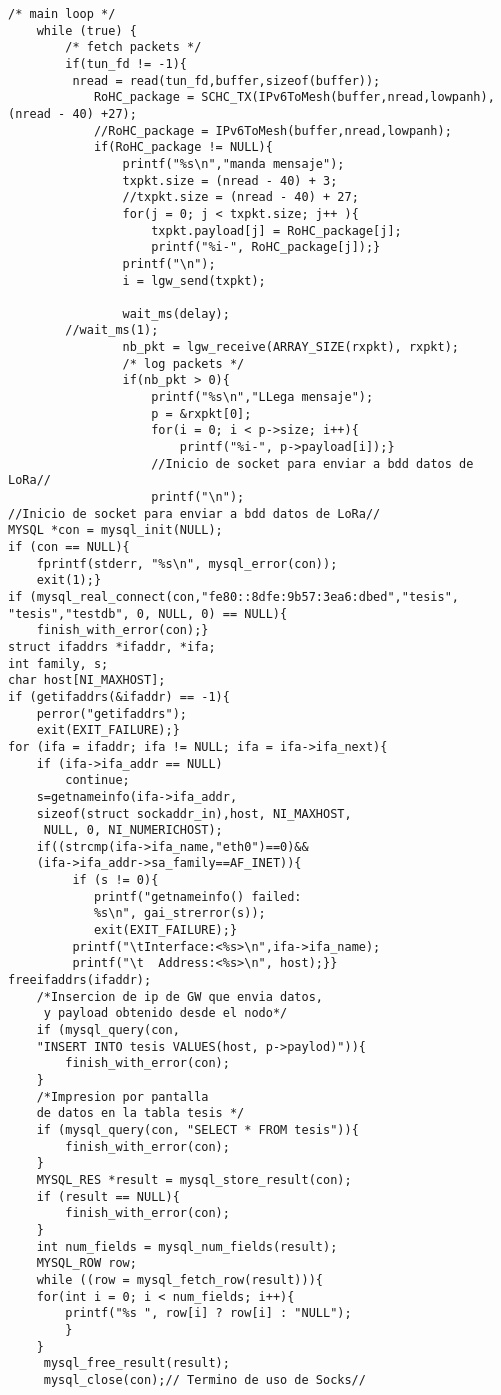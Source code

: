 \begin{lstlisting}[frame=single,caption=Extracto de código del módulo de transición LoRa/IPv6	]  % Start your code-block
/* main loop */
    while (true) {
        /* fetch packets */
        if(tun_fd != -1){
         nread = read(tun_fd,buffer,sizeof(buffer));   
            RoHC_package = SCHC_TX(IPv6ToMesh(buffer,nread,lowpanh),(nread - 40) +27);
            //RoHC_package = IPv6ToMesh(buffer,nread,lowpanh);
            if(RoHC_package != NULL){
                printf("%s\n","manda mensaje");
                txpkt.size = (nread - 40) + 3;
                //txpkt.size = (nread - 40) + 27;
                for(j = 0; j < txpkt.size; j++ ){
                    txpkt.payload[j] = RoHC_package[j];
                    printf("%i-", RoHC_package[j]);}
                printf("\n");
                i = lgw_send(txpkt);

                wait_ms(delay);
        //wait_ms(1);
                nb_pkt = lgw_receive(ARRAY_SIZE(rxpkt), rxpkt);
                /* log packets */
                if(nb_pkt > 0){
                    printf("%s\n","LLega mensaje");
                    p = &rxpkt[0];
                    for(i = 0; i < p->size; i++){
                        printf("%i-", p->payload[i]);}
                    //Inicio de socket para enviar a bdd datos de LoRa//
                    printf("\n");
//Inicio de socket para enviar a bdd datos de LoRa//
MYSQL *con = mysql_init(NULL);
if (con == NULL){
	fprintf(stderr, "%s\n", mysql_error(con));
    exit(1);}
if (mysql_real_connect(con,"fe80::8dfe:9b57:3ea6:dbed","tesis", "tesis","testdb", 0, NULL, 0) == NULL){
	finish_with_error(con);} 
struct ifaddrs *ifaddr, *ifa;
int family, s;
char host[NI_MAXHOST];
if (getifaddrs(&ifaddr) == -1){
	perror("getifaddrs");
	exit(EXIT_FAILURE);}
for (ifa = ifaddr; ifa != NULL; ifa = ifa->ifa_next){
	if (ifa->ifa_addr == NULL)
		continue;  
	s=getnameinfo(ifa->ifa_addr,
	sizeof(struct sockaddr_in),host, NI_MAXHOST,
	 NULL, 0, NI_NUMERICHOST);
	if((strcmp(ifa->ifa_name,"eth0")==0)&&
	(ifa->ifa_addr->sa_family==AF_INET)){
    	 if (s != 0){
       	 	printf("getnameinfo() failed: 
       	 	%s\n", gai_strerror(s));
        	exit(EXIT_FAILURE);}
         printf("\tInterface:<%s>\n",ifa->ifa_name);
         printf("\t  Address:<%s>\n", host);}}
freeifaddrs(ifaddr);
	/*Insercion de ip de GW que envia datos,
	 y payload obtenido desde el nodo*/
	if (mysql_query(con,
	"INSERT INTO tesis VALUES(host, p->paylod)")){
		finish_with_error(con);
	}
    /*Impresion por pantalla 
    de datos en la tabla tesis */  
	if (mysql_query(con, "SELECT * FROM tesis")){
    	finish_with_error(con);
  	} 
	MYSQL_RES *result = mysql_store_result(con);
	if (result == NULL){
		finish_with_error(con);
	}
	int num_fields = mysql_num_fields(result);
    MYSQL_ROW row;
    while ((row = mysql_fetch_row(result))){ 
	for(int i = 0; i < num_fields; i++){ 
		printf("%s ", row[i] ? row[i] : "NULL"); 
		} 
	}
	 mysql_free_result(result);
	 mysql_close(con);// Termino de uso de Socks//
\end{lstlisting}
\label{anexc:1}

%
%